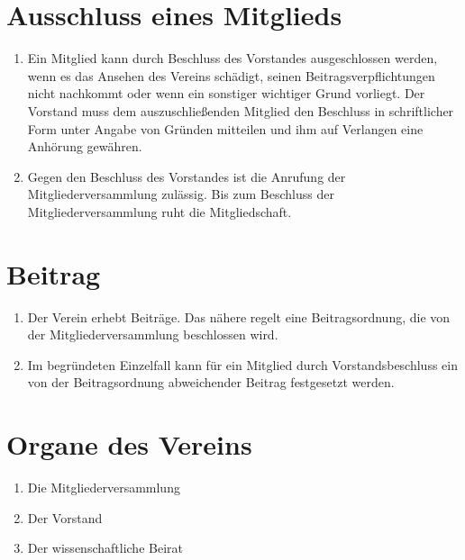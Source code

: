 \documentclass[a4paper, 12pt]{scrartcl}
\begin{document}
\section{Ausschluss eines Mitglieds}
     \begin{enumerate}
	  \item Ein Mitglied kann durch Beschluss des Vorstandes ausgeschlossen werden, wenn es das Ansehen des Vereins schädigt, seinen Beitragsverpflichtungen nicht nachkommt oder wenn ein sonstiger wichtiger Grund vorliegt. Der Vorstand muss dem auszuschließenden Mitglied den Beschluss in schriftlicher Form unter Angabe von Gründen mitteilen und ihm auf Verlangen eine Anhörung gewähren.  
	  \item Gegen den Beschluss des Vorstandes ist die Anrufung der Mitgliederversammlung zulässig. Bis zum Beschluss der Mitgliederversammlung ruht die Mitgliedschaft.
     \end{enumerate}

\section{Beitrag}
     \begin{enumerate}
	  \item Der Verein erhebt Beiträge. Das nähere regelt eine Beitragsordnung, die von der Mitgliederversammlung beschlossen wird.  
	  \item Im begründeten Einzelfall kann für ein Mitglied durch Vorstandsbeschluss ein von der Beitragsordnung abweichender Beitrag festgesetzt werden.
     \end{enumerate}

\section{Organe des Vereins}
     \begin{enumerate}
	  \item Die Mitgliederversammlung 
	  \item Der Vorstand
	  \item Der wissenschaftliche Beirat
     \end{enumerate}
\end{document}
